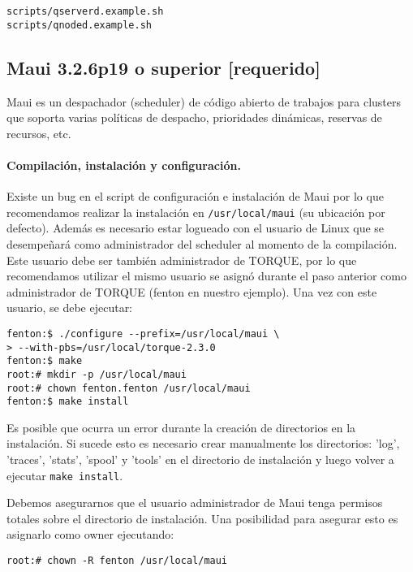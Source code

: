 \documentclass[a4paper,10pt,spanish]{article}
\begin{document}
\begin{verbatim}
scripts/qserverd.example.sh
scripts/qnoded.example.sh
\end{verbatim}

\subsection{Maui 3.2.6p19 o superior \small{[requerido]}}

Maui\cite{maui} es un despachador (scheduler) de c\'{o}digo abierto de trabajos para clusters que soporta varias pol\'{i}ticas de despacho, prioridades din\'{a}micas, reservas de recursos, etc.

\paragraph{Compilaci\'{o}n, instalaci\'{o}n y configuraci\'{o}n.}

Existe un bug en el script de configuraci\'{o}n e instalaci\'{o}n de Maui por lo que recomendamos realizar la instalaci\'{o}n en \mbox{\texttt{/usr/local/maui}} (su ubicaci\'{o}n por defecto). Adem\'{a}s es necesario estar logueado con el usuario de Linux que se desempe\~{n}ar\'{a} como administrador del scheduler al momento de la compilaci\'{o}n. Este usuario debe ser tambi\'{e}n administrador de TORQUE, por lo que recomendamos utilizar el mismo usuario se asign\'{o} durante el paso anterior como administrador de TORQUE (fenton en nuestro ejemplo). Una vez con este usuario, se debe ejecutar:

\begin{verbatim}
fenton:$ ./configure --prefix=/usr/local/maui \
> --with-pbs=/usr/local/torque-2.3.0
fenton:$ make 
root:# mkdir -p /usr/local/maui
root:# chown fenton.fenton /usr/local/maui
fenton:$ make install
\end{verbatim}

Es posible que ocurra un error durante la creaci\'{o}n de directorios en la instalaci\'{o}n. Si sucede esto es necesario crear manualmente los directorios: 'log', 'traces', 'stats', 'spool' y 'tools' en el directorio de instalaci\'{o}n y luego volver a ejecutar \mbox{\texttt{make install}}. 

Debemos asegurarnos que el usuario administrador de Maui tenga permisos totales sobre el directorio de instalaci\'{o}n. Una posibilidad para asegurar esto es asignarlo como owner ejecutando:

\begin{verbatim}
root:# chown -R fenton /usr/local/maui
\end{verbatim}
\end{document}
